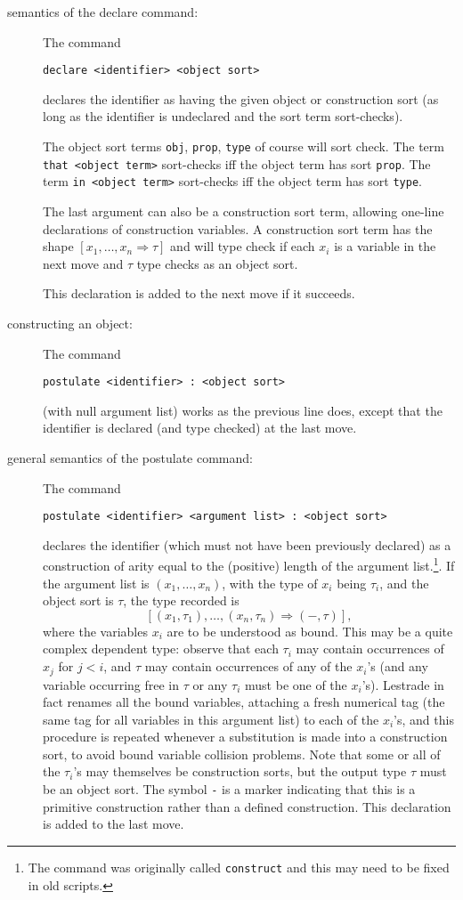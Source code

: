 \documentclass[12pt]{article}
\begin{document}
\begin{description}
\item[semantics of the declare command:]  The command \begin{center}{\tt declare <identifier> <object sort>}\end{center}  declares the identifier as having the given object or construction sort (as long as the identifier is undeclared and the sort term sort-checks).

The object sort terms {\tt obj}, {\tt prop}, {\tt type} of course will sort check.  The term {\tt that <object term>} sort-checks iff the object term has sort {\tt prop}.   The term {\tt in <object term>} sort-checks iff the object term has sort {\tt type}.   

The last argument can also be a construction sort term, allowing one-line declarations of construction variables.  A construction sort term has the shape
$[x_1,\ldots,x_n \Rightarrow \tau]$ and will type check if each $x_i$ is a variable in the next move and $\tau$ type checks as an object sort.

This declaration is added to the next move if it succeeds.

\item[constructing an object:]  The command \begin{center}{\tt postulate <identifier> : <object sort>}\end{center} (with null argument list) works as the previous line does, except that the identifier is declared (and type checked) at the last move.

\item[general semantics of the postulate command:]  The command \begin{center}{\tt postulate <identifier> <argument list> : <object sort>}\end{center} declares the identifier (which must not have been previously declared) as a construction of arity equal to the (positive) length of the argument list.\footnote{The command was originally called {\tt construct} and this may need to be fixed in old scripts.}.  If the argument list
is $(x_1,\ldots,x_n)$, with the type of $x_i$ being $\tau_i$,  and the object sort is $\tau$,  the type recorded is $$[(x_1,\tau_1),\ldots,(x_n,\tau_n) \Rightarrow (-,\tau)],$$ where
the variables $x_i$ are to be understood as bound.   This may be a quite complex dependent type:  observe that each $\tau_i$ may contain occurrences of $x_j$ for $j<i$,
and $\tau$ may contain occurrences of any of the $x_i$'s (and any variable occurring free in $\tau$ or any $\tau_i$ must be one of the $x_i$'s).  Lestrade in fact renames all the bound variables, attaching a fresh numerical tag (the same tag for all variables in this argument list) to each of the $x_i$'s, and this procedure is repeated whenever a substitution is made into a construction sort, to avoid bound variable collision problems.
Note that some or all of the $\tau_i$'s may themselves be construction sorts, but the output type $\tau$ must be an object sort.  The symbol {\tt -} is a marker indicating that this is a primitive construction rather than a defined construction.  This declaration is added to the last move.


\end{description}
\end{document}
